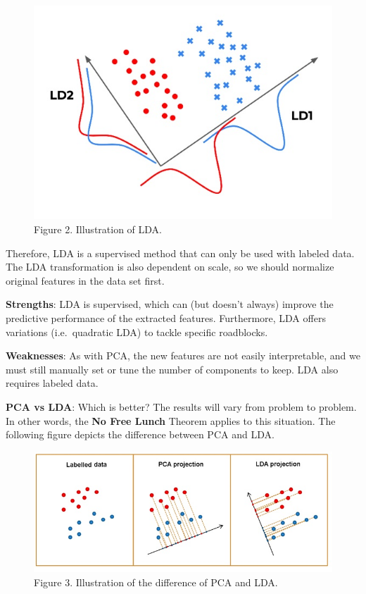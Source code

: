\documentclass[
]{article}
\begin{document}
\begin{figure}

{\centering \includegraphics[width=7.67in]{img/w10-LDA} 

}

\caption{Figure 2. Illustration of LDA.}\label{fig:unnamed-chunk-2}
\end{figure}

Therefore, LDA is a supervised method that can only be used with labeled
data. The LDA transformation is also dependent on scale, so we should
normalize original features in the data set first.

\textbf{Strengths}: LDA is supervised, which can (but doesn't always)
improve the predictive performance of the extracted features.
Furthermore, LDA offers variations (i.e.~quadratic LDA) to tackle
specific roadblocks.

\textbf{Weaknesses}: As with PCA, the new features are not easily
interpretable, and we must still manually set or tune the number of
components to keep. LDA also requires labeled data.

\textbf{PCA vs LDA}: Which is better? The results will vary from problem
to problem. In other words, the \textbf{No Free Lunch} Theorem applies
to this situation. The following figure depicts the difference between
PCA and LDA.

\begin{figure}

{\centering \includegraphics[width=9.75in]{img/w10-LDA-vs-LDA} 

}

\caption{Figure 3. Illustration of the difference of PCA and LDA.}\label{fig:unnamed-chunk-3}
\end{figure}
\end{document}
